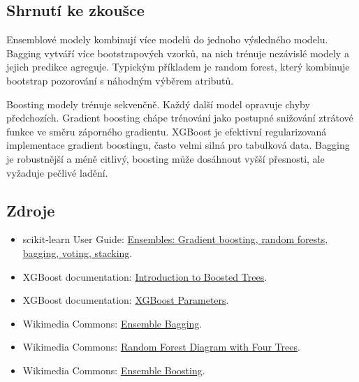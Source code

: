\subsection{Shrnutí ke zkoušce}

Ensemblové modely kombinují více modelů do jednoho výsledného modelu. Bagging vytváří více bootstrapových
vzorků, na nich trénuje nezávislé modely a jejich predikce agreguje. Typickým příkladem je random forest,
který kombinuje bootstrap pozorování s náhodným výběrem atributů.

Boosting modely trénuje sekvenčně. Každý další model opravuje chyby předchozích. Gradient boosting chápe
trénování jako postupné snižování ztrátové funkce ve směru záporného gradientu. XGBoost je efektivní
regularizovaná implementace gradient boostingu, často velmi silná pro tabulková data. Bagging je robustnější
a méně citlivý, boosting může dosáhnout vyšší přesnosti, ale vyžaduje pečlivé ladění.

\subsection{Zdroje}

\begin{itemize}
    \item scikit-learn User Guide:
    \href{https://scikit-learn.org/stable/modules/ensemble.html}{Ensembles: Gradient boosting, random forests,
    bagging, voting, stacking}.
    \item XGBoost documentation:
    \href{https://xgboost.readthedocs.io/en/stable/tutorials/model.html}{Introduction to Boosted Trees}.
    \item XGBoost documentation:
    \href{https://xgboost.readthedocs.io/en/stable/parameter.html}{XGBoost Parameters}.
    \item Wikimedia Commons:
    \href{https://commons.wikimedia.org/wiki/File:Ensemble\_Bagging.svg}{Ensemble Bagging}.
    \item Wikimedia Commons:
    \href{https://commons.wikimedia.org/wiki/File:Random\_Forest\_Diagram\_with\_Four\_Trees.png}{Random Forest
    Diagram with Four Trees}.
    \item Wikimedia Commons:
    \href{https://commons.wikimedia.org/wiki/File:Ensemble\_Boosting.svg}{Ensemble Boosting}.
\end{itemize}

\newpage

